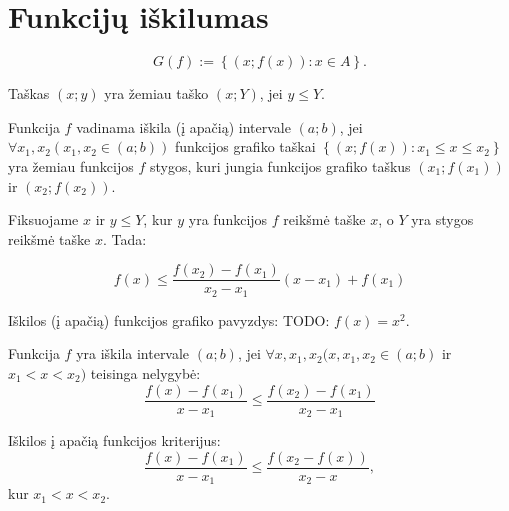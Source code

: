\section{Funkcijų iškilumas}

\begin{defn}
  \begin{equation*}
    G(f) := \left\{ (x; f(x)) : x \in A \right\}.
  \end{equation*}
\end{defn}

\begin{defn}
  Taškas $(x; y)$ yra žemiau taško $(x; Y)$, jei $y \leq Y$.
\end{defn}

\begin{defn}
  Funkcija $f$ vadinama iškila (į apačią) intervale $(a; b)$, jei
  $\forall x_{1}, x_{2} (x_{1},x_{2} \in (a; b))$ funkcijos grafiko
  taškai $\left\{ (x; f(x)) : x_{1} \leq x \leq x_{2} \right\}$
  yra žemiau funkcijos $f$ stygos, kuri jungia funkcijos 
  grafiko taškus $(x_{1}; f(x_{1}))$ ir $(x_{2}; f(x_{2}))$.

  Fiksuojame $x$ ir $y \leq Y$, kur $y$ yra funkcijos $f$ reikšmė 
  taške $x$, o $Y$ yra stygos reikšmė taške $x$. Tada:

  \begin{equation*}
    f(x) \leq 
      \frac{f(x_{2}) - f(x_{1})}{x_{2} - x_{1}}(x - x_{1}) + f(x_{1})
  \end{equation*}
\end{defn}

\begin{exmp}
  Iškilos (į apačią) funkcijos grafiko pavyzdys: TODO: $f(x) = x^{2}$.
\end{exmp}

\begin{defn}
  Funkcija $f$ yra iškila intervale $(a; b)$, jei
  $\forall x, x_{1}, x_{2} (x, x_{1}, x_{2} \in (a; b)$ ir
  $x_{1} < x < x_{2})$ teisinga nelygybė:
  \begin{equation*}
    \frac{f(x) - f(x_{1})}{x - x_{1}} 
    \leq \frac{f(x_{2}) - f(x_{1})}{x_{2} - x_{1}}
  \end{equation*}
\end{defn}

\begin{defn}
  Iškilos į apačią funkcijos kriterijus:
  \begin{equation*}
    \frac{f(x) - f(x_{1})}{x - x_{1}} 
    \leq \frac{f(x_{2} - f(x))}{x_{2} - x},
  \end{equation*}
  kur $x_{1} < x < x_{2}$.
\end{defn}

